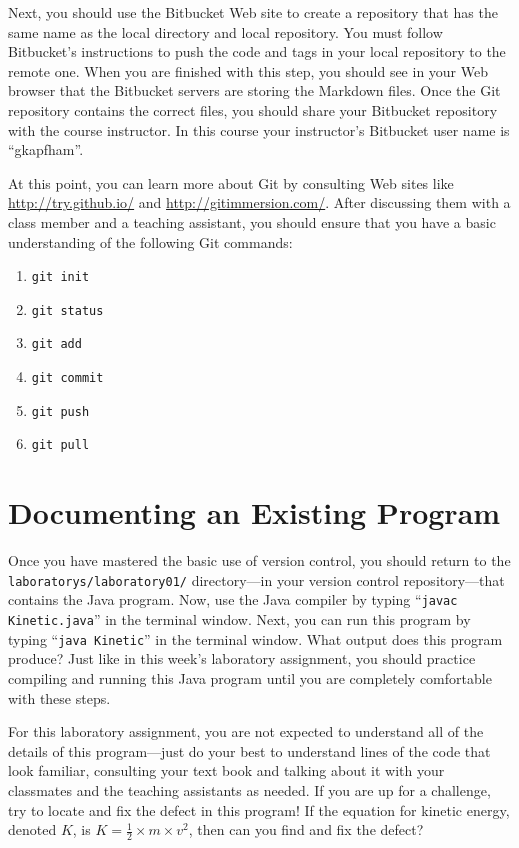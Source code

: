 Next, you should use the Bitbucket Web site to create a repository that has the same name as the local directory and
local repository.  You must follow Bitbucket's instructions to push the code and tags in your local repository to the
remote one. When you are finished with this step, you should see in your Web browser that the Bitbucket servers are
storing the Markdown files. Once the Git repository contains the correct files, you should share your Bitbucket repository
with the course instructor. In this course your instructor's Bitbucket user name is ``gkapfham''.

At this point, you can learn more about Git by consulting Web sites like \url{http://try.github.io/} and
\url{http://gitimmersion.com/}.  After discussing them with a class member and a teaching assistant, you should ensure
that you have a basic understanding of the following Git commands:

\vspace*{-.125in}
\begin{enumerate}
  \setlength{\itemsep}{-.03in}
  \item {\tt git init}
  \item {\tt git status}
  \item {\tt git add}
  \item {\tt git commit}
  \item {\tt git push}
  \item {\tt git pull}
\end{enumerate}
\vspace*{-.15in}

\section*{Documenting an Existing Program}

Once you have mastered the basic use of version control, you should return to the \\ {\tt laboratorys/laboratory01/}
directory---in your version control repository---that contains the Java program. Now, use the Java compiler by typing
``{\tt javac Kinetic.java}'' in the terminal window.  Next, you can run this program by typing ``{\tt java Kinetic}'' in
the terminal window.  What output does this program produce?  Just like in this week's laboratory assignment, you should
practice compiling and running this Java program until you are completely comfortable with these steps.

For this laboratory assignment, you are not expected to understand all of the details of this program---just do your best
to understand lines of the code that look familiar, consulting your text book and talking about it with your classmates
and the teaching assistants as needed. If you are up for a challenge, try to locate and fix the defect in this program!
If the equation for kinetic energy, denoted $K$, is $K=\frac{1}{2} \times m \times v^2$, then can you find and fix the
defect?

